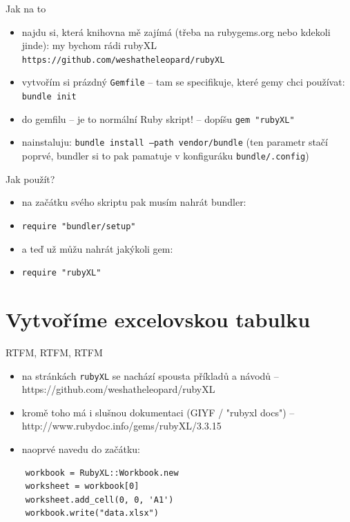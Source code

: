\documentclass{beamer}
\begin{document}
\begin{frame}{Jak na to}
  \begin{itemize}
    \item najdu si, která knihovna mě zajímá (třeba na rubygems.org nebo kdekoli jinde): my bychom rádi rubyXL \texttt{https://github.com/weshatheleopard/rubyXL}
    \item vytvořím si prázdný \texttt{Gemfile} -- tam se specifikuje, které gemy chci používat: \texttt{bundle init}
    \item do gemfilu -- je to normální Ruby skript! -- dopíšu \texttt{gem "rubyXL"}
    \item nainstaluju: \texttt{bundle install --path vendor/bundle} (ten parametr stačí poprvé, bundler si to pak pamatuje v konfiguráku \texttt{bundle/.config})
  \end{itemize}
\end{frame}

\begin{frame}{Jak použít?}
  \begin{itemize}
    \item na začátku svého skriptu pak musím nahrát bundler:
    \item \texttt{require "bundler/setup"}
    \item a teď už můžu nahrát jakýkoli gem:
    \item \texttt{require "rubyXL"}
  \end{itemize}
\end{frame}

\section{Vytvoříme excelovskou tabulku}

\begin{frame}[fragile]{RTFM, RTFM, RTFM}
  \begin{itemize}
    \item na stránkách \texttt{rubyXL} se nachází spousta příkladů a návodů -- https://github.com/weshatheleopard/rubyXL
    \item kromě toho má i slušnou dokumentaci (GIYF / "rubyxl docs") -- http://www.rubydoc.info/gems/rubyXL/3.3.15
    \item naoprvé navedu do začátku:
  \end{itemize}
  {\tiny
  \begin{verbatim}
    workbook = RubyXL::Workbook.new
    worksheet = workbook[0]
    worksheet.add_cell(0, 0, 'A1')
    workbook.write("data.xlsx")
  \end{verbatim}
  }
\end{frame}
\end{document}

